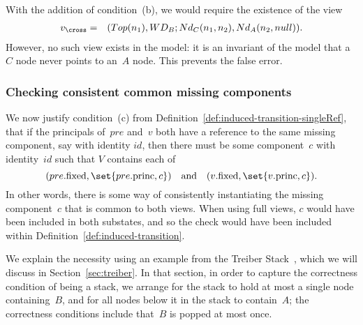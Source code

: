 With the addition of condition~(b), we would require the existence of the view
\begin{eqnarray*}
v_\cross & = &  (Top(n_1), WD_B ; Nd_C(n_1, n_2), Nd_A(n_2, null)).
\end{eqnarray*}
%
However, no such view exists in the model: it is an invariant of the model
that a $C$ node never points to an~$A$ node.  This prevents the false error.




\subsubsection{Checking consistent common missing components}
\label{ssec:missing-common}

We now justify condition~(c) from
Definition~\ref{def:induced-transition-singleRef}, that if the principals
of~$pre$ and~$v$ both have a reference to the same missing component, say with
identity $id$, then there must be some component~$c$ with identity~$id$ such
that $V$ contains each of
\[
(pre.\fixed, \set{pre.\princ, c}) \quad\mbox{and}\quad 
(v.\fixed, \set{v.\princ, c}).
\]
In other words, there is some way of consistently instantiating the missing
component~$c$ that is common to both views. When using full views,
$c$ would have been included in both substates, and so the check would have
been included within Definition~\ref{def:induced-transition}.



We explain the necessity using an example from the Treiber
Stack~\cite{treiber}, which we will discuss in Section~\ref{sec:treiber}.  In
that section, in order to capture the correctness condition of being a stack,
we arrange for the stack to hold at most a single node containing~$B$, and for
all nodes below it in the stack to contain~$A$; the correctness conditions
include that~$B$ is popped at most once.

